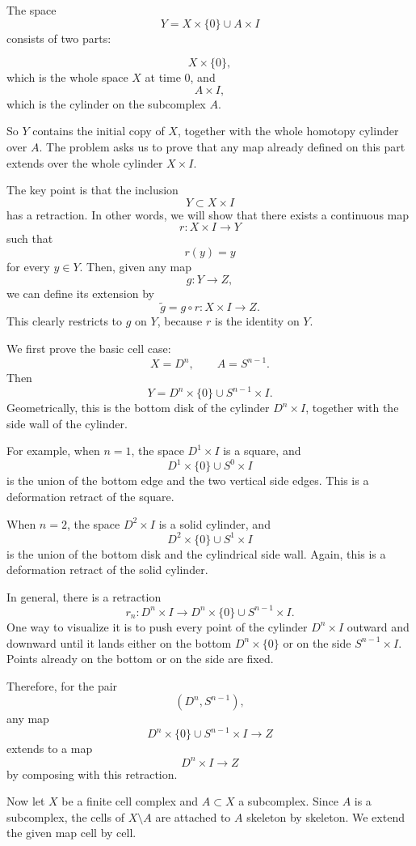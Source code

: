\begin{solution}
The space
\[
Y=X\times\{0\}\cup A\times I
\]
consists of two parts:

\[
X\times\{0\},
\]
which is the whole space \(X\) at time \(0\), and
\[
A\times I,
\]
which is the cylinder on the subcomplex \(A\).

So \(Y\) contains the initial copy of \(X\), together with the whole homotopy cylinder over \(A\). The problem asks us to prove that any map already defined on this part extends over the whole cylinder \(X\times I\).

The key point is that the inclusion
\[
Y\subset X\times I
\]
has a retraction. In other words, we will show that there exists a continuous map
\[
r:X\times I\longrightarrow Y
\]
such that
\[
r(y)=y
\]
for every \(y\in Y\). Then, given any map
\[
g:Y\longrightarrow Z,
\]
we can define its extension by
\[
\widetilde g=g\circ r:X\times I\longrightarrow Z.
\]
This clearly restricts to \(g\) on \(Y\), because \(r\) is the identity on \(Y\).

We first prove the basic cell case:
\[
X=D^n,\qquad A=S^{n-1}.
\]
Then
\[
Y=D^n\times\{0\}\cup S^{n-1}\times I.
\]
Geometrically, this is the bottom disk of the cylinder \(D^n\times I\), together with the side wall of the cylinder.

For example, when \(n=1\), the space \(D^1\times I\) is a square, and
\[
D^1\times\{0\}\cup S^0\times I
\]
is the union of the bottom edge and the two vertical side edges. This is a deformation retract of the square.

When \(n=2\), the space \(D^2\times I\) is a solid cylinder, and
\[
D^2\times\{0\}\cup S^1\times I
\]
is the union of the bottom disk and the cylindrical side wall. Again, this is a deformation retract of the solid cylinder.

In general, there is a retraction
\[
r_n:D^n\times I\longrightarrow D^n\times\{0\}\cup S^{n-1}\times I.
\]
One way to visualize it is to push every point of the cylinder \(D^n\times I\) outward and downward until it lands either on the bottom \(D^n\times\{0\}\) or on the side \(S^{n-1}\times I\). Points already on the bottom or on the side are fixed.

Therefore, for the pair
\[
(D^n,S^{n-1}),
\]
any map
\[
D^n\times\{0\}\cup S^{n-1}\times I
\longrightarrow Z
\]
extends to a map
\[
D^n\times I\longrightarrow Z
\]
by composing with this retraction.

Now let \(X\) be a finite cell complex and \(A\subset X\) a subcomplex. Since \(A\) is a subcomplex, the cells of \(X\setminus A\) are attached to \(A\) skeleton by skeleton. We extend the given map cell by cell.


\end{solution}
